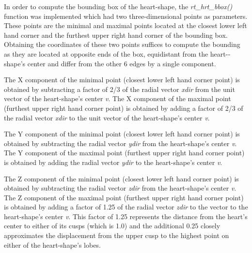 \hspace{30} In   order   to   compute   the   bounding   box   of   the   heart­-shape, the  
\textit{rt\_hrt\_bbox()} function was implemented which had two three­-dimensional points as  
parameters. These   points   are   the   minimal   and   maximal   points   located   at   the  
closest   lower   left   hand   corner   and   the   furthest   upper   right   hand   corner   of   the  
bounding   box.   Obtaining   the   coordinates   of   these   two   points   suffices   to  
compute   the   bounding   as   they   are   located   at   opposite   ends   of   the   box,  
equidistant   from   the   heart-­shape's   center   and   differ   from   the   other   6   edges   by  
a single  component.  

\hspace{30} The   X   component   of   the   minimal   point   (closest   lower   left   hand   corner  
point) is obtained by subtracting a factor of 2/3 of the radial vector \textit{xdir} from the unit vector of the  
heart-­shape's center \textit{v}.   The   X   component   of   the   maximal   point (furthest upper right hand corner point) is obtained   by   adding  a factor of 2/3 of the radial vector \textit{xdir} to the unit vector of the heart-­shape's center \textit{v}.

\hspace{30}The Y component of the minimal point (closest lower left hand corner point) is obtained by subtracting the radial vector \textit{ydir} from the heart-­shape's center  \textit{v}. The Y component of the maximal point (furthest upper right hand corner point) is obtained by adding the radial vector \textit{ydir} to the heart-­shape's center \textit{v}.    

\hspace{30} The   Z component   of   the   minimal   point   (closest   lower   left   hand   corner   point)   is  
obtained   by   subtracting   the   radial   vector \textit{zdir}  from   the   heart-­shape's   center  \textit{v}. The   Z  
component   of   the   maximal   point   (furthest   upper   right   hand   corner   point)   is  
obtained   by   adding a factor   of   1.25 of the radial vector \textit{zdir}  to   the   vector   to   the   heart­-shape's  
center \textit{v}. This   factor   of   1.25 represents   the   distance   from   the   heart's  
center   to   either   of   its   cusps   (which   is   1.0)   and   the   additional   0.25   closely  
approximates   the   displacement   from   the   upper   cusp   to   the   highest   point   on  
either   of   the heart-shape's   lobes.

